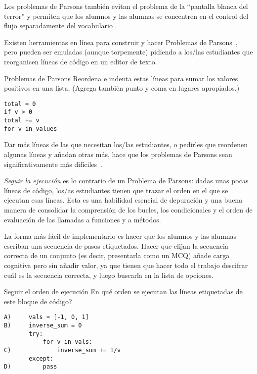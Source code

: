Los problemas de Parsons  también evitan el problema de la ``pantalla blanca del terror'' y permiten que los alumnos y las alumnas se concentren en el control del flujo separadamente del vocabulario \cite{Pars2006,Eric2015,Morr2016,Eric2017}.

Existen herramientas  en línea para construir y hacer Problemas de Parsons~\cite{Ihan2011},
pero pueden ser emuladas (aunque torpemente) 
pidiendo a los/las estudiantes que reorganicen líneas de código en un editor de texto.

\begin{aside}{Problemas de Parsons}
  Reordena e indenta estas líneas para sumar los valores positivos en una lista.
  (Agrega también punto y coma en lugares apropiados.)

\begin{verbatim}
total = 0
if v > 0
total += v
for v in values
\end{verbatim}
\end{aside}

Dar más líneas de las que necesitan los/las estudiantes, o pedirles que reordenen algunas líneas y añadan otras más, hace que los problemas de Parsons sean significativamente más difíciles~\cite{Harm2016}.


\emph{Seguir la ejecución} es lo contrario de un Problema de Parsons: 
dadas unas pocas líneas de código, 
los/as estudiantes tienen que trazar el orden en el que se ejecutan esas líneas.
Esta es una habilidad esencial de depuración
 y una buena manera de consolidar la comprensión de los bucles, los condicionales y el orden de evaluación de las llamadas a funciones y a métodos.

La forma más fácil de implementarlo es hacer que los alumnos y las alumnas escriban una secuencia de pasos etiquetados.
Hacer que elijan la secuencia correcta de un conjunto 
(es decir, presentarla como un MCQ) 
añade carga cognitiva pero sin añadir valor, 
ya que tienen que hacer todo el trabajo descifrar cuál es la secuencia correcta, y luego buscarla en la lista de opciones.

\begin{aside}{Seguir el orden de ejecución}
  En qué orden se ejecutan las líneas etiquetadas de este bloque de código?

\begin{verbatim}
A)     vals = [-1, 0, 1]
B)     inverse_sum = 0
       try:
           for v in vals:
C)             inverse_sum += 1/v
       except:
D)         pass
\end{verbatim}
\end{aside}


